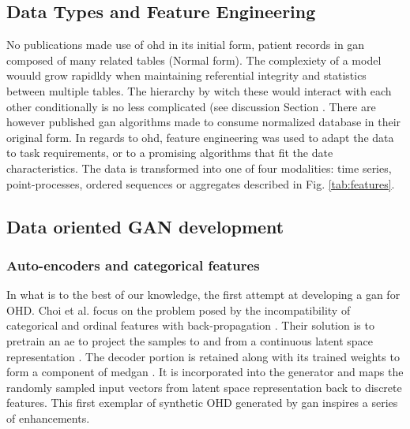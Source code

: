             

    \subsection{Data Types and Feature Engineering}

        No publications made use of \gls{ohd} in its initial form, patient records in \gls{gan} composed of many related tables (Normal form). The complexiety of a model wouuld grow rapidldy when maintaining referential integrity and statistics between multiple tables. The hierarchy by witch these would interact with each other conditionally is no less complicated (see discussion Section . There are however published \gls{gan} algorithms made to consume normalized database in their original form. \todo In regards to \gls{ohd}, feature engineering was used to adapt the data to task requirements, or to a promising algorithms that fit the date characteristics. The data is transformed into one of four modalities: time series, point-processes, ordered sequences or aggregates described in Fig. \ref{tab:features}.

        

    \subsection{Data oriented GAN development}\label{subsec:data_gan_dev}

        \subsubsection{Auto-encoders and categorical features}\label{subsubsec:categorical}

            In what is to the best of our knowledge, the first attempt at developing a \gls{gan} for OHD. Choi et al. focus on the problem posed by the incompatibility of categorical and ordinal features with back-propagation . Their solution is to pretrain an \gls{ae} to project the samples to and from a continuous latent space representation . The decoder portion is retained along with its trained weights to form a component of \gls{medgan} \cite{Choi2017-nt}. It is incorporated into the generator and maps the randomly sampled input vectors from latent space representation back to discrete features. This first exemplar of synthetic OHD generated by \gls{gan} inspires a series of enhancements.\par

